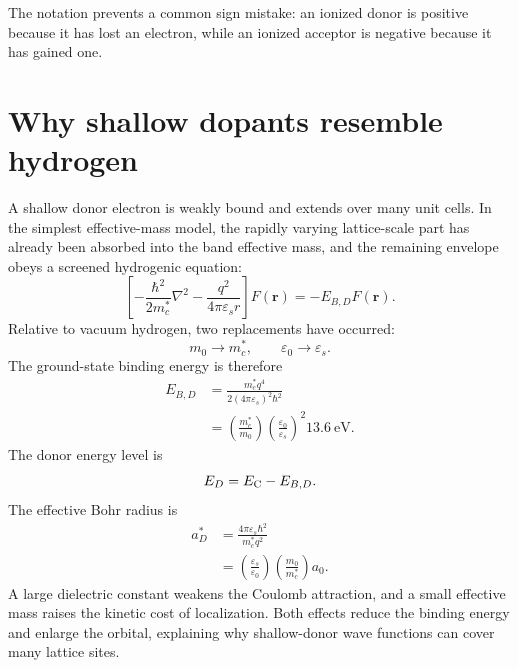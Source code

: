 The notation prevents a common sign mistake: an ionized donor is positive
because it has lost an electron, while an ionized acceptor is negative because
it has gained one.

\section{Why shallow dopants resemble hydrogen}

A shallow donor electron is weakly bound and extends over many unit cells.  In
the simplest effective-mass model, the rapidly varying lattice-scale part has
already been absorbed into the band effective mass, and the remaining envelope
obeys a screened hydrogenic equation:
\begin{equation}
  \left[
    -\frac{\hbar^2}{2m_c^*}\nabla^2
    -\frac{q^2}{4\pi\varepsilon_s r}
  \right]F(\bm r)
  =-E_{B,D}F(\bm r).
  \label{eq:effective-mass-donor-hamiltonian}
\end{equation}
Relative to vacuum hydrogen, two replacements have occurred:
\begin{equation}
  m_0\longrightarrow m_c^*,
  \qquad
  \varepsilon_0\longrightarrow\varepsilon_s.
  \label{eq:hydrogenic-donor-replacements}
\end{equation}
The ground-state binding energy is therefore
\begin{equation}
\begin{aligned}
  E_{B,D}
  &=\frac{m_c^*q^4}
    {2(4\pi\varepsilon_s)^2\hbar^2}\\
  &=\left(\frac{m_c^*}{m_0}\right)
    \left(\frac{\varepsilon_0}{\varepsilon_s}\right)^2
    \SI{13.6}{\electronvolt}.
\end{aligned}
  \label{eq:effective-donor-binding-energy}
\end{equation}
The donor energy level is
\begin{equation}
  E_D=E_{\mathrm C}-E_{B,D}.
  \label{eq:donor-level-from-binding-energy}
\end{equation}
The effective Bohr radius is
\begin{equation}
\begin{aligned}
  a_D^*
  &=\frac{4\pi\varepsilon_s\hbar^2}{m_c^*q^2}\\
  &=\left(\frac{\varepsilon_s}{\varepsilon_0}\right)
    \left(\frac{m_0}{m_c^*}\right)a_0.
\end{aligned}
  \label{eq:effective-donor-bohr-radius}
\end{equation}
A large dielectric constant weakens the Coulomb attraction, and a small
effective mass raises the kinetic cost of localization.  Both effects reduce
the binding energy and enlarge the orbital, explaining why shallow-donor wave
functions can cover many lattice sites.

